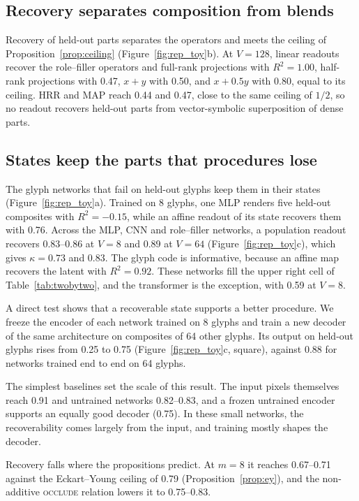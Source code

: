 \documentclass[10pt]{article}
\theoremstyle{plain}
\theoremstyle{remark}
\begin{document}
\subsection{Recovery separates composition from blends}
\label{sec:calibration}

Recovery of held-out parts separates the operators and meets the ceiling of Proposition~\ref{prop:ceiling} (Figure~\ref{fig:rep_toy}b). At $V = 128$, linear readouts recover the role--filler operators and full-rank projections with $R^2 = 1.00$, half-rank projections with 0.47, $x + y$ with 0.50, and $x + 0.5y$ with 0.80, equal to its ceiling. HRR and MAP reach 0.44 and 0.47, close to the same ceiling of $1/2$, so no readout recovers held-out parts from vector-symbolic superposition of dense parts.

\subsection{States keep the parts that procedures lose}
\label{sec:states}

The glyph networks that fail on held-out glyphs keep them in their states (Figure~\ref{fig:rep_toy}a). Trained on 8 glyphs, one MLP renders five held-out composites with $R^2 = -0.15$, while an affine readout of its state recovers them with 0.76. Across the MLP, CNN and role--filler networks, a population readout recovers 0.83--0.86 at $V = 8$ and 0.89 at $V = 64$ (Figure~\ref{fig:rep_toy}c), which gives $\kappa = 0.73$ and $0.83$. The glyph code is informative, because an affine map recovers the latent with $R^2 = 0.92$. These networks fill the upper right cell of Table~\ref{tab:twobytwo}, and the transformer is the exception, with 0.59 at $V = 8$.

A direct test shows that a recoverable state supports a better procedure. We freeze the encoder of each network trained on 8 glyphs and train a new decoder of the same architecture on composites of 64 other glyphs. Its output on held-out glyphs rises from 0.25 to 0.75 (Figure~\ref{fig:rep_toy}c, square), against 0.88 for networks trained end to end on 64 glyphs.

The simplest baselines set the scale of this result. The input pixels themselves reach 0.91 and untrained networks 0.82--0.83, and a frozen untrained encoder supports an equally good decoder (0.75). In these small networks, the recoverability comes largely from the input, and training mostly shapes the decoder.

Recovery falls where the propositions predict. At $m = 8$ it reaches 0.67--0.71 against the Eckart--Young ceiling of 0.79 (Proposition~\ref{prop:ey}), and the non-additive \textsc{occlude} relation lowers it to 0.75--0.83.
\end{document}
